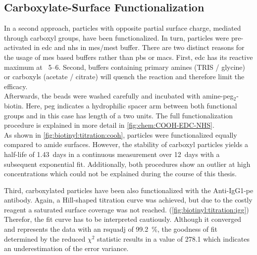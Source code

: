 \subsection{Carboxylate-Surface Functionalization}
In a second approach, particles with opposite partial surface charge, mediated through \gls{carboxyl} groups, have been functionalized. In turn, particles were pre-activated in \gls{edc} and \gls{nhs} in \gls{mes}/\gls{mest} buffer. There are two distinct reasons for the usage of \gls{mes} based buffers rather than \gls{pbs} or \gls{macs}. First, \gls{edc} has its reactive maximum at \pH\ \numrange{5}{6}. Second, buffers containing primary \glspl{amine} (TRIS / glycine) or \glspl{carboxyl} (acetate / citrate) will quench the reaction and therefore limit the efficacy.\\
Afterwards, the beads were washed carefully and incubated with \gls{amine}-\acrshort{peg}$_2$-biotin. Here, \gls{peg} indicates a hydrophilic spacer arm between both functional groups and in this case has length of a two units. The full functionalization procedure is explained in more detail in \cref{fig:chem:COOH-EDC-NHS}. \\
As shown in \cref{fig:biotinyl:titration:cooh}, particles were functionalized equally compared to \gls{amide} surfaces. However, the stability of \gls{carboxyl} particles yields a half-life of \SI{1.43}{days} in a continuous measurement over \SI{12}{days} with a subsequent exponential fit. Additionally, both procedures show an outlier at high concentrations which could not be explained during the course of this thesis. 

Third, \gls{carboxyl}ated particles have been also functionalized with the Anti-IgG1-\gls{pe} antibody. Again, a Hill-shaped titration curve was achieved, but due to the costly reagent a saturated surface coverage was not reached. (\cref{fig:biotinyl:titration:igg}) \\
Therefor, the fit curve has to be interpreted cautiously. Although it converged and represents the data with an \gls{rsquadj} of \SI{99.2}{\percent}, the goodness of fit determined by the reduced $\chi^2$ statistic results in a value of \num{278.1} which indicates an underestimation of the error variance.

\clearpage
